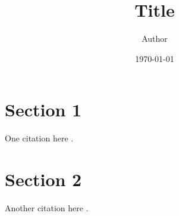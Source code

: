 \documentclass[10pt]{article}
\title{Title}
\author{Author}
\date{\today}
\begin{document}
\bibliographyunit[\section]


\maketitle

\section{Section 1}
\label{sec:section-1}

One citation here \cite{test06}.

\putbib


\section{Section 2}
\label{sec:section-2}


Another citation here \cite{test04}.

\putbib


\bibliographyunit
\let\thebibliography\stdthebibliography



\end{document}

